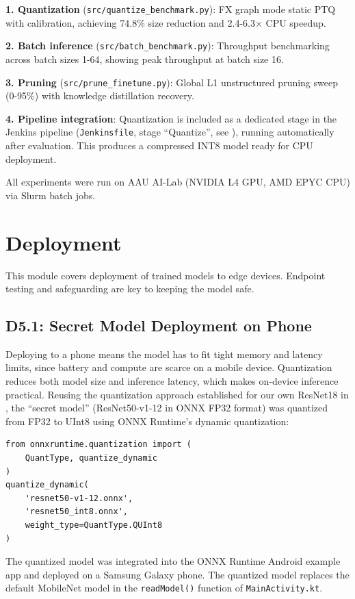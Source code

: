 \documentclass[10pt,twocolumn,letterpaper]{article}
\begin{document}
\textbf{1. Quantization} (\texttt{src/quantize\_benchmark.py}): FX graph mode static PTQ with calibration, achieving 74.8\% size reduction and 2.4-6.3$\times$ CPU speedup.

\textbf{2. Batch inference} (\texttt{src/batch\_benchmark.py}): Throughput benchmarking across batch sizes 1-64, showing peak throughput at batch size 16.

\textbf{3. Pruning} (\texttt{src/prune\_finetune.py}): Global L1 unstructured pruning sweep (0-95\%) with knowledge distillation recovery.

\textbf{4. Pipeline integration}: Quantization is included as a dedicated stage in the Jenkins pipeline (\texttt{Jenkinsfile}, stage ``Quantize'', see ), running automatically after evaluation. This produces a compressed INT8 model ready for CPU deployment.

All experiments were run on AAU AI-Lab (NVIDIA L4 GPU, AMD EPYC CPU) via Slurm batch jobs.

\section{Deployment}\label{sec:deployment}

This module covers deployment of trained models to edge devices. Endpoint testing and safeguarding are key to keeping the model safe.

\subsection{D5.1: Secret Model Deployment on Phone}

Deploying to a phone means the model has to fit tight memory and latency limits, since battery and compute are scarce on a mobile device. Quantization reduces both model size and inference latency, which makes on-device inference practical. Reusing the quantization approach established for our own ResNet18 in , the ``secret model'' (ResNet50-v1-12 in ONNX FP32 format) was quantized from FP32 to UInt8 using ONNX Runtime's dynamic quantization:

\begin{verbatim}
from onnxruntime.quantization import (
    QuantType, quantize_dynamic
)
quantize_dynamic(
    'resnet50-v1-12.onnx',
    'resnet50_int8.onnx',
    weight_type=QuantType.QUInt8
)
\end{verbatim}

The quantized model was integrated into the ONNX Runtime Android example app and deployed on a Samsung Galaxy phone. The quantized model replaces the default MobileNet model in the \texttt{readModel()} function of \texttt{MainActivity.kt}.
\end{document}
